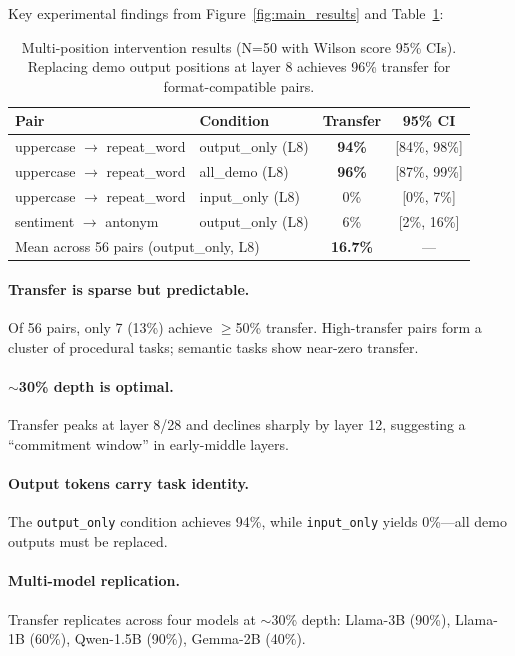 \documentclass{article}
\begin{document}
Key experimental findings from Figure~\ref{fig:main_results} and Table~\ref{tab:multi}:

\begin{table}[t]
\caption{Multi-position intervention results (N=50 with Wilson score 95\% CIs). Replacing demo output positions at layer 8 achieves 96\% transfer for format-compatible pairs.}
\label{tab:multi}
\centering
\small
\begin{tabular}{@{}llcc@{}}
\toprule
Pair & Condition & Transfer & 95\% CI \\
\midrule
uppercase $\to$ repeat\_word & output\_only (L8) & \textbf{94\%} & [84\%, 98\%] \\
uppercase $\to$ repeat\_word & all\_demo (L8) & \textbf{96\%} & [87\%, 99\%] \\
uppercase $\to$ repeat\_word & input\_only (L8) & 0\% & [0\%, 7\%] \\
sentiment $\to$ antonym & output\_only (L8) & 6\% & [2\%, 16\%] \\
\midrule
\multicolumn{2}{l}{Mean across 56 pairs (output\_only, L8)} & \textbf{16.7\%} & --- \\
\bottomrule
\end{tabular}
\end{table}

\paragraph{Transfer is sparse but predictable.} Of 56 pairs, only 7 (13\%) achieve $\geq$50\% transfer. High-transfer pairs form a cluster of procedural tasks; semantic tasks show near-zero transfer.

\paragraph{$\sim$30\% depth is optimal.} Transfer peaks at layer 8/28 and declines sharply by layer 12, suggesting a ``commitment window'' in early-middle layers.

\paragraph{Output tokens carry task identity.} The \texttt{output\_only} condition achieves 94\%, while \texttt{input\_only} yields 0\%---all demo outputs must be replaced.

\paragraph{Multi-model replication.} Transfer replicates across four models at $\sim$30\% depth: Llama-3B (90\%), Llama-1B (60\%), Qwen-1.5B (90\%), Gemma-2B (40\%).
\end{document}
